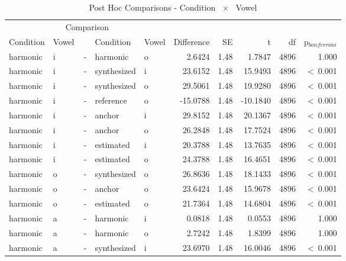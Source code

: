 \documentclass[a4paper,man,hidelinks,floatsintext]{apa7}
\begin{document}
    
\begin{table}[!htbp]
\caption{Post Hoc Comparisons - Condition ~$\times$~ Vowel}
\label{tab:Table_7}
\begin{adjustbox}{max size={\columnwidth}{\textheight}}
\centering
\begin{tabular}{llrllrrrrr}
\hline
\multicolumn{5}{c}{Comparison} & \multicolumn{5}{c}{~} \\
\cline{1-5}
Condition   & Vowel & ~ & Condition   & Vowel & Difference &   SE &        t &   df & p$_{bonferroni}$ \\
\hline
harmonic    & i     & - & harmonic    & o     &     2.6424 & 1.48 &   1.7847 & 4896 &            1.000 \\
harmonic    & i     & - & synthesized & i     &    23.6152 & 1.48 &  15.9493 & 4896 &  \textless~0.001 \\
harmonic    & i     & - & synthesized & o     &    29.5061 & 1.48 &  19.9280 & 4896 &  \textless~0.001 \\
harmonic    & i     & - & reference   & o     &   -15.0788 & 1.48 & -10.1840 & 4896 &  \textless~0.001 \\
harmonic    & i     & - & anchor      & i     &    29.8152 & 1.48 &  20.1367 & 4896 &  \textless~0.001 \\
harmonic    & i     & - & anchor      & o     &    26.2848 & 1.48 &  17.7524 & 4896 &  \textless~0.001 \\
harmonic    & i     & - & estimated   & i     &    20.3788 & 1.48 &  13.7635 & 4896 &  \textless~0.001 \\
harmonic    & i     & - & estimated   & o     &    24.3788 & 1.48 &  16.4651 & 4896 &  \textless~0.001 \\
harmonic    & o     & - & synthesized & o     &    26.8636 & 1.48 &  18.1433 & 4896 &  \textless~0.001 \\
harmonic    & o     & - & anchor      & o     &    23.6424 & 1.48 &  15.9678 & 4896 &  \textless~0.001 \\
harmonic    & o     & - & estimated   & o     &    21.7364 & 1.48 &  14.6804 & 4896 &  \textless~0.001 \\
harmonic    & a     & - & harmonic    & i     &     0.0818 & 1.48 &   0.0553 & 4896 &            1.000 \\
harmonic    & a     & - & harmonic    & o     &     2.7242 & 1.48 &   1.8399 & 4896 &            1.000 \\
harmonic    & a     & - & synthesized & i     &    23.6970 & 1.48 &  16.0046 & 4896 &  \textless~0.001 \\

\end{tabular}
\end{adjustbox}
\end{table}
\end{document}
